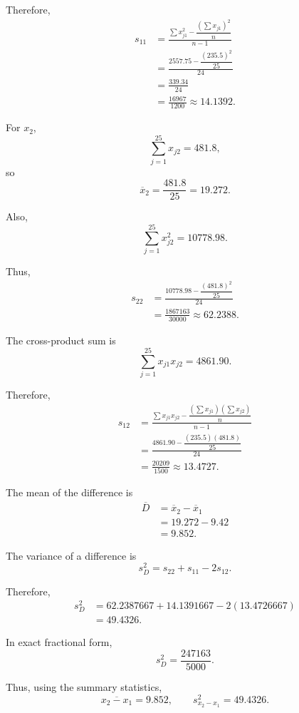 \documentclass[12pt,a4paper]{article}
\begin{document}
Therefore,
\[
\begin{aligned}
s_{11}
&=
\frac{
\sum x_{j1}^2
-\dfrac{(\sum x_{j1})^2}{n}
}{n-1}\\
&=
\frac{
2557.75-\dfrac{(235.5)^2}{25}
}{24}\\
&=
\frac{339.34}{24}\\
&=
\boxed{\frac{16967}{1200}}
\approx 14.1392.
\end{aligned}
\]

For \(x_2\),
\[
\sum_{j=1}^{25}x_{j2}=481.8,
\]
so
\[
\overline{x}_2
=
\frac{481.8}{25}
=
\boxed{19.272}.
\]

Also,
\[
\sum_{j=1}^{25}x_{j2}^2=10778.98.
\]

Thus,
\[
\begin{aligned}
s_{22}
&=
\frac{
10778.98-\dfrac{(481.8)^2}{25}
}{24}\\
&=
\boxed{\frac{1867163}{30000}}
\approx 62.2388.
\end{aligned}
\]

The cross-product sum is
\[
\sum_{j=1}^{25}x_{j1}x_{j2}=4861.90.
\]

Therefore,
\[
\begin{aligned}
s_{12}
&=
\frac{
\sum x_{j1}x_{j2}
-\dfrac{(\sum x_{j1})(\sum x_{j2})}{n}
}{n-1}\\
&=
\frac{
4861.90-\dfrac{(235.5)(481.8)}{25}
}{24}\\
&=
\boxed{\frac{20209}{1500}}
\approx 13.4727.
\end{aligned}
\]

The mean of the difference is
\[
\begin{aligned}
\overline{D}
&=
\overline{x}_2-\overline{x}_1\\
&=
19.272-9.42\\
&=
\boxed{9.852}.
\end{aligned}
\]

The variance of a difference is
\[
s_D^2
=
s_{22}+s_{11}-2s_{12}.
\]

Therefore,
\[
\begin{aligned}
s_D^2
&=
62.2387667+14.1391667
-2(13.4726667)\\
&=
\boxed{49.4326}.
\end{aligned}
\]

In exact fractional form,
\[
\boxed{
s_D^2=\frac{247163}{5000}.
}
\]

Thus, using the summary statistics,
\[
\boxed{
\overline{x_2-x_1}=9.852,
\qquad
s_{x_2-x_1}^2=49.4326.
}
\]

\end{document}
